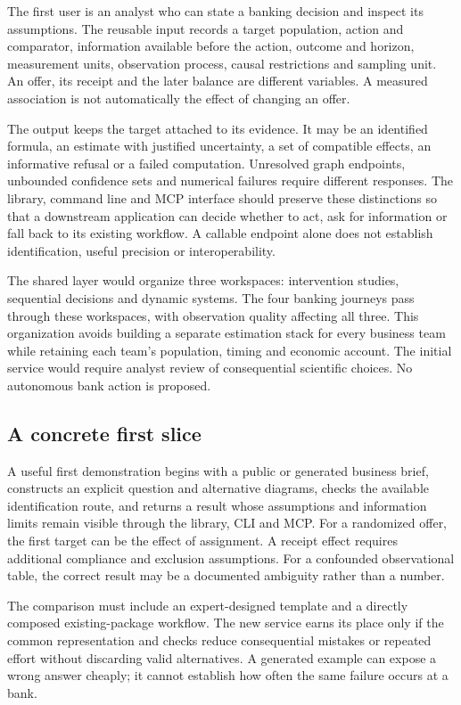 The first user is an analyst who can state a banking decision and
inspect its assumptions. The reusable input records a target population,
action and comparator, information available before the action, outcome
and horizon, measurement units, observation process, causal restrictions
and sampling unit. An offer, its receipt and the later balance are
different variables. A measured association is not automatically the
effect of changing an offer.

The output keeps the target attached to its evidence. It may be an
identified formula, an estimate with justified uncertainty, a set of
compatible effects, an informative refusal or a failed computation.
Unresolved graph endpoints, unbounded confidence sets and numerical
failures require different responses. The library, command line and MCP
interface should preserve these distinctions so that a downstream
application can decide whether to act, ask for information or fall back
to its existing workflow. A callable endpoint alone does not establish
identification, useful precision or interoperability.
\citep{sp13_interfaces}

The shared layer would organize three workspaces: intervention studies,
sequential decisions and dynamic systems. The four banking journeys pass
through these workspaces, with observation quality affecting all three.
This organization avoids building a separate estimation stack for every
business team while retaining each team's population, timing and
economic account. The initial service would require analyst review of
consequential scientific choices. No autonomous bank action is proposed.

\hypertarget{a-concrete-first-slice}{%
\subsection{A concrete first slice}\label{a-concrete-first-slice}}

A useful first demonstration begins with a public or generated business
brief, constructs an explicit question and alternative diagrams, checks
the available identification route, and returns a result whose
assumptions and information limits remain visible through the library,
CLI and MCP. For a randomized offer, the first target can be the effect
of assignment. A receipt effect requires additional compliance and
exclusion assumptions. For a confounded observational table, the correct
result may be a documented ambiguity rather than a number.

The comparison must include an expert-designed template and a directly
composed existing-package workflow. The new service earns its place only
if the common representation and checks reduce consequential mistakes or
repeated effort without discarding valid alternatives. A generated
example can expose a wrong answer cheaply; it cannot establish how often
the same failure occurs at a bank.

